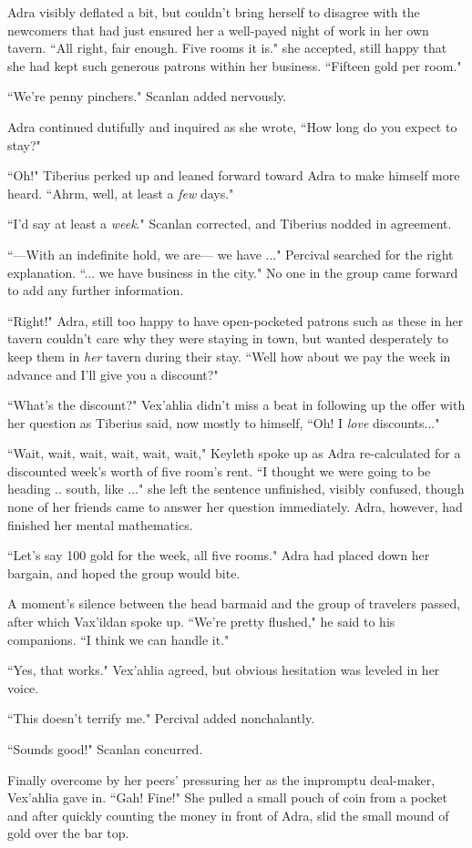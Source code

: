 Adra visibly deflated a bit, but couldn't bring herself to disagree with the newcomers that had just ensured her a well-payed night of work in her own tavern. ``All right, fair enough. Five rooms it is." she accepted, still happy that she had kept such generous patrons within her business. ``Fifteen gold per room." 

``We're penny pinchers." Scanlan added nervously.

Adra continued dutifully and inquired as she wrote, ``How long do you expect to stay?"

``Oh!" Tiberius perked up and leaned forward toward Adra to make himself more heard. ``Ahrm, well, at least a \textit{few} days."

``I'd say at least a \textit{week}." Scanlan corrected, and Tiberius nodded in agreement.

``---With an indefinite hold, we are--- we have ..." Percival searched for the right explanation. ``... we have business in the city." No one in the group came forward to add any further information.

``Right!" Adra, still too happy to have open-pocketed patrons such as these in her tavern couldn't care why they were staying in town, but wanted desperately to keep them in \textit{her} tavern during their stay. ``Well how about we pay the week in advance and I'll give you a discount?"

``What's the discount?" Vex'ahlia didn't miss a beat in following up the offer with her question as Tiberius said, now mostly to himself, ``Oh! I \textit{love} discounts..."

``Wait, wait, wait, wait, wait, wait," Keyleth spoke up as Adra re-calculated for a discounted week's worth of five room's rent. ``I thought we were going to be heading .. south, like ..." she left the sentence unfinished, visibly confused, though none of her friends came to answer her question immediately. Adra, however, had finished her mental mathematics.

``Let's say 100 gold for the week, all five rooms." Adra had placed down her bargain, and hoped the group would bite.

A moment's silence between the head barmaid and the group of travelers passed, after which Vax'ildan spoke up. ``We're pretty flushed," he said to his companions. ``I think we can handle it."

``Yes, that works." Vex'ahlia agreed, but obvious hesitation was leveled in her voice.

``This doesn't terrify me." Percival added nonchalantly.

``Sounds good!" Scanlan concurred.

Finally overcome by her peers' pressuring her as the impromptu deal-maker, Vex'ahlia gave in. ``Gah! Fine!" She pulled a small pouch of coin from a pocket and after quickly counting the money in front of Adra, slid the small mound of gold over the bar top.


\newpage


